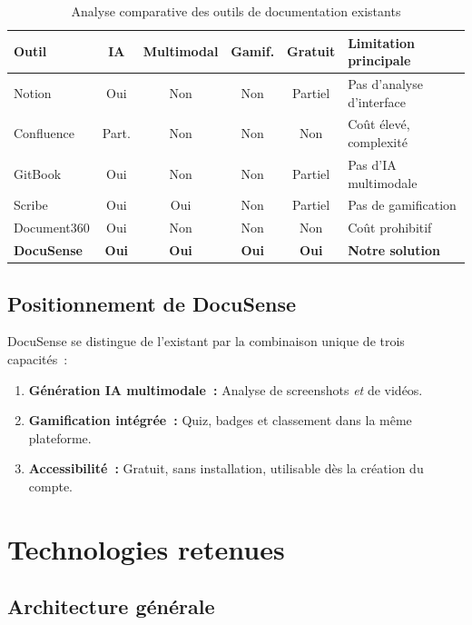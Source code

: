 \documentclass[12pt, a4paper, twoside, openany]{report}
\begin{document}
\begin{table}[H]
  \centering
  \caption{Analyse comparative des outils de documentation existants}
  \label{tab:comparatif}
  \renewcommand{\arraystretch}{1.3}
  \begin{tabularx}{\textwidth}{l c c c c X}
    \toprule
    \textbf{Outil} & \textbf{IA} & \textbf{Multimodal}
      & \textbf{Gamif.} & \textbf{Gratuit} & \textbf{Limitation principale} \\
    \midrule
    Notion      & Oui  & Non  & Non & Partiel & Pas d'analyse d'interface \\
    Confluence  & Part.& Non  & Non & Non & Co\^ut \'elev\'e, complexit\'e \\
    GitBook     & Oui  & Non  & Non & Partiel & Pas d'IA multimodale \\
    Scribe      & Oui  & Oui  & Non & Partiel & Pas de gamification \\
    Document360 & Oui  & Non  & Non & Non & Co\^ut prohibitif \\
    \textbf{DocuSense} & \textbf{Oui} & \textbf{Oui} & \textbf{Oui}
      & \textbf{Oui} & \textbf{Notre solution} \\
    \bottomrule
  \end{tabularx}
\end{table}

\subsection{Positionnement de DocuSense}

DocuSense se distingue de l'existant par la combinaison unique de trois capacit\'es~:
\begin{enumerate}
  \item \textbf{G\'en\'eration IA multimodale~:} Analyse de screenshots
        \emph{et} de vid\'eos.
  \item \textbf{Gamification int\'egr\'ee~:} Quiz, badges et classement dans
        la m\^eme plateforme.
  \item \textbf{Accessibilit\'e~:} Gratuit, sans installation, utilisable d\`es
        la cr\'eation du compte.
\end{enumerate}

\section{Technologies retenues}

\subsection{Architecture g\'en\'erale}
\end{document}
